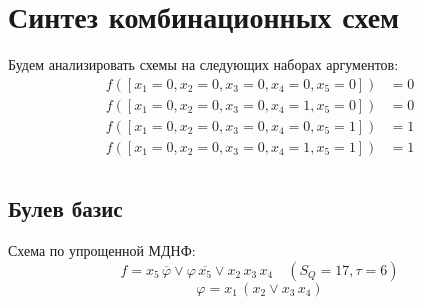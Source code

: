 \documentclass{article}
\begin{document}
\section*{Синтез комбинационных схем}
Будем анализировать схемы на следующих наборах аргументов:
\begin{align*}
    f([x_1 = 0, x_2 = 0, x_3 = 0, x_4 = 0, x_5 = 0]) &= 0 \\
    f([x_1 = 0, x_2 = 0, x_3 = 0, x_4 = 1, x_5 = 0]) &= 0 \\
    f([x_1 = 0, x_2 = 0, x_3 = 0, x_4 = 0, x_5 = 1]) &= 1 \\
    f([x_1 = 0, x_2 = 0, x_3 = 0, x_4 = 1, x_5 = 1]) &= 1 \\
\end{align*}
\subsection*{Булев базис}
Схема по упрощенной МДНФ:
\[f = x_{5} \, \overline{\varphi} \lor \varphi \, \overline{x_{5}} \lor x_{2} \, x_{3} \, x_{4}\quad(S_Q = 17, \tau = 6)\]
\[\varphi = x_{1} \, \left(x_{2} \lor x_{3} \, x_{4}\right)\]
\end{document}
